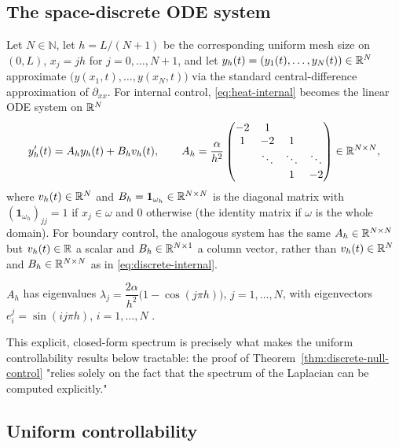 \subsection{The space-discrete ODE system}
\label{ssec:space-discrete-system}

Let $N \in \mathbb{N}$, let $h = L/(N+1)$ be the corresponding uniform mesh
size on $(0,L)$, $x_j = jh$ for $j=0,\dots,N+1$, and let
$y_h(t) = (y_1(t),\dots,y_N(t)) \in \mathbb{R}^N$ approximate
$\big(y(x_1,t),\dots,y(x_N,t)\big)$ via the standard central-difference
approximation of $\partial_{xx}$. For internal control, \eqref{eq:heat-internal}
becomes the linear ODE system on $\mathbb{R}^N$
\begin{equation}
  \label{eq:discrete-internal}
  y_h'(t) = A_h y_h(t) + B_h v_h(t), \qquad
  A_h = \frac{\alpha}{h^2}
  \begin{pmatrix}
    -2 & 1 & & \\
    1 & -2 & 1 & \\
    & \ddots & \ddots & \ddots \\
    & & 1 & -2
  \end{pmatrix} \in \mathbb{R}^{N\times N},
\end{equation}
where $v_h(t) \in \mathbb{R}^N$ and $B_h = \mathbf{1}_{\omega_h} \in \mathbb{R}^{N\times N}$ is
the diagonal matrix with $(\mathbf{1}_{\omega_h})_{jj}=1$ if $x_j \in \omega$
and $0$ otherwise (the identity matrix if $\omega$ is the whole domain). For
boundary control, the analogous system \citep[cf.][]{leveque2007finite} has
the same $A_h \in \mathbb{R}^{N\times N}$ but $v_h(t) \in \mathbb{R}$ a scalar and
$B_h \in \mathbb{R}^{N\times 1}$ a column vector, rather than $v_h(t) \in \mathbb{R}^N$ and
$B_h \in \mathbb{R}^{N\times N}$ as in \eqref{eq:discrete-internal}.

\begin{proposition}[Spectrum of $A_h$]
  \label{prop:spectrum}
  $A_h$ has eigenvalues
  $\lambda_j = \dfrac{2\alpha}{h^2}\big(1-\cos(j\pi h)\big)$, $j=1,\dots,N$,
  with eigenvectors $e^j_i = \sin(ij\pi h)$, $i=1,\dots,N$
  \citep[\S3.4]{leveque2007finite}.
\end{proposition}

This explicit, closed-form spectrum is precisely what makes the uniform
controllability results below tractable: the proof of
Theorem~\ref{thm:discrete-null-control} "relies solely on the fact that the
spectrum of the Laplacian can be computed explicitly."

\subsection{Uniform controllability}
\label{ssec:uniform-controllability}


